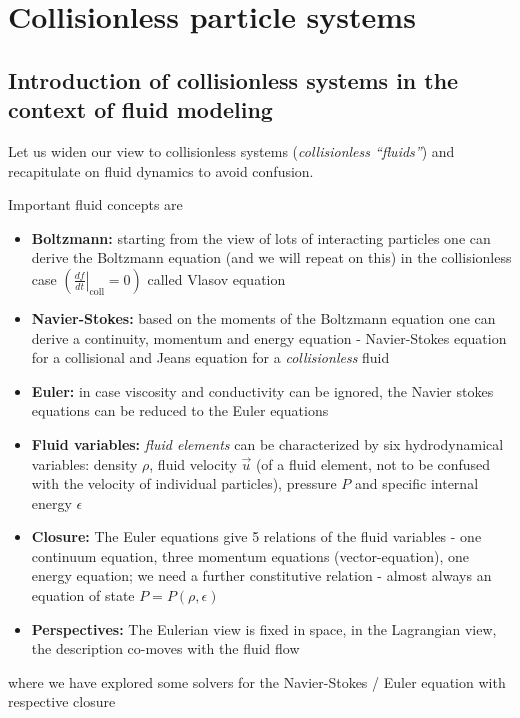 \section{Collisionless particle systems}
\thispagestyle{plain}

\subsection{Introduction of collisionless systems in the context of fluid modeling}

Let us widen our view to collisionless systems (\textit{collisionless \enquote{fluids}}) and recapitulate
on fluid dynamics to avoid confusion.

\textcolor{blue1}{Important fluid concepts are}

\begin{itemize}
    \item \textbf{Boltzmann: }starting from the view of lots of interacting particles one can derive the Boltzmann equation (and we will repeat on this) in the collisionless case $\left( \left. \frac{df}{dt} \right|_\text{coll} = 0 \right)$ called Vlasov equation
    \item \textbf{Navier-Stokes: }based on the moments of the Boltzmann equation one can derive a continuity, momentum and energy equation - Navier-Stokes equation for a collisional and Jeans equation for a \textit{collisionless} fluid
    \item \textbf{Euler: }in case viscosity and conductivity can be ignored, the Navier stokes equations can be reduced to the Euler equations
    \item \textbf{Fluid variables: }\textit{fluid elements} can be characterized by six hydrodynamical variables: density $\rho$, fluid velocity $\vec{u}$ (of a fluid element, not to be confused with the velocity of individual particles), pressure $P$ and specific internal energy $\epsilon$
    \item \textbf{Closure: }The Euler equations give 5 relations of the fluid variables - one continuum equation, three momentum equations (vector-equation), one energy equation; we need a further constitutive relation - almost always an equation of state $P = P(\rho,\epsilon)$
    \item \textbf{Perspectives: } The Eulerian view is fixed in space, in the Lagrangian view, the description co-moves with the fluid flow
\end{itemize}

\textcolor{blue1}{where we have explored some solvers for the Navier-Stokes / Euler equation with respective closure}

